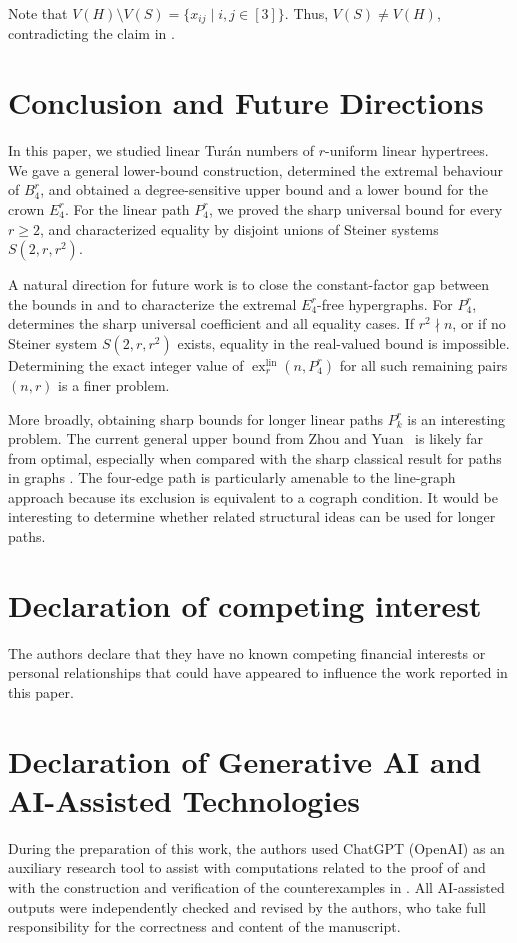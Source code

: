 \documentclass[11pt,a4paper]{article}
\theoremstyle{definition}
\theoremstyle{remark}
\begin{document}
Note that $V(H)\setminus V(S) = \{x_{ij} \mid i,j \in [3]\}$. Thus, $V(S) \neq V(H)$, contradicting the claim in \cite{zhang2025linear}.

\section*{Conclusion and Future Directions}

In this paper, we studied linear Tur\'an numbers of \(r\)-uniform linear
hypertrees. We gave a general lower-bound construction, determined the
extremal behaviour of \(B_4^r\), and obtained a degree-sensitive upper
bound and a lower bound for the crown \(E_4^r\). For the linear path
\(P_4^r\), we proved the sharp universal bound for every \(r\geq 2\), and characterized equality by disjoint unions of
Steiner systems \(S(2,r,r^2)\).

A natural direction for future work is to close the constant-factor gap
between the bounds in  and to characterize the
extremal \(E_4^r\)-free hypergraphs. For \(P_4^r\), 
determines the sharp universal coefficient and all equality cases. If
\(r^2\nmid n\), or if no Steiner system \(S(2,r,r^2)\) exists, equality
in the real-valued bound is impossible. Determining the exact integer
value of \(\operatorname{ex}^{\mathrm{lin}}_r(n,P_4^r)\) for all such
remaining pairs \((n,r)\) is a finer problem.

More broadly, obtaining sharp bounds for longer linear paths \(P_k^r\)
is an interesting problem. The current general upper bound from Zhou
and Yuan~\cite{zhou2025turan} is likely far from optimal, especially
when compared with the sharp classical result for paths in graphs
\cite{gallai1959maximal}. The four-edge path is particularly amenable
to the line-graph approach because its exclusion is equivalent to a
cograph condition. It would be interesting to determine whether
related structural ideas can be used for longer paths.

\section*{Declaration of competing interest}

The authors declare that they have no known competing financial
interests or personal relationships that could have appeared to
influence the work reported in this paper.

\section*{Declaration of Generative AI and AI-Assisted Technologies}

During the preparation of this work, the authors used ChatGPT (OpenAI) as an auxiliary research tool to assist with computations related to the proof of  and with the construction and verification of the counterexamples in . All AI-assisted outputs were independently checked and revised by the authors, who take full responsibility for the correctness and content of the manuscript.



\end{document}
